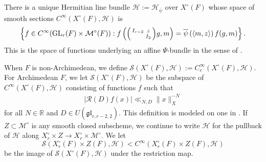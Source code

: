 \documentclass[12pt]{amsart}
\theoremstyle{remark}
\numberwithin{equation}{section}
\newcommand{\GL}{\mathrm{GL}}
\newcommand{\RR}{\mathbb{R}}
\theoremstyle{definition}
\newenvironment{psmatrix}
  {\left(\begin{smallmatrix}}
  {\end{smallmatrix}\right)}
\numberwithin{equation}{subsection}
\newcommand{\norm}[1]{\lVert#1\rVert}
\begin{document}
There is a unique Hermitian line bundle $\mathcal{H}:=\mathcal{H}_{\overline{\psi}}$ over $X^\circ(F)$ whose space of smooth sections $C^\infty(X^\circ(F),\mathcal{H})$ is
$$
\left\{f \in C^\infty(\GL_r(F) \times \mathcal{M}^{\circ}(F)): f\left(\begin{psmatrix} I_{r-2} & z\\ & I_2 \end{psmatrix}g,m\right)=\overline{\psi}\left( \langle m,z \rangle \right)f(g,m)\right\}.
$$
This is the space of functions underlying an affine $\Psi$-bundle in the sense of \cite{GGHL}.  


When $F$ is non-Archimedean, we define 
$\mathcal{S}(X^\circ(F),\mathcal{H}):=C_c^\infty(X^\circ(F),\mathcal{H}).$ 
For Archimedean $F$, we let $\mathcal{S}(X^\circ(F),\mathcal{H})$ be the subspace of $C^\infty(X^\circ(F),\mathcal{H})$ consisting of functions $f$ such that
\begin{align*}
\left|\mathcal{R}(D)f(x)\right| \ll_{N,D}    \norm{x}_{X}^{-N}
\end{align*}
for all $N\in \RR$ and $D \in U(\mathfrak{gl}_{r,r-2,2}).$  This definition is modeled on one in \cite[\S 2.4]{BP:GLn}.  If $Z \subset \mathcal{M}^\circ$ is any smooth closed subscheme, we continue to write $\mathcal{H}$ for the pullback of $\mathcal{H}$ along $X^\circ_r \times Z \to X^\circ_r \times \mathcal{M}^\circ.$
We let
$$
\mathcal{S}(X^{\circ}_r(F) \times Z(F),\mathcal{H})<C^\infty(X^\circ_r(F) \times Z(F),\mathcal{H})
$$
be the image of $\mathcal{S}(X^\circ(F),\mathcal{H})$ under the restriction map.
\end{document}
